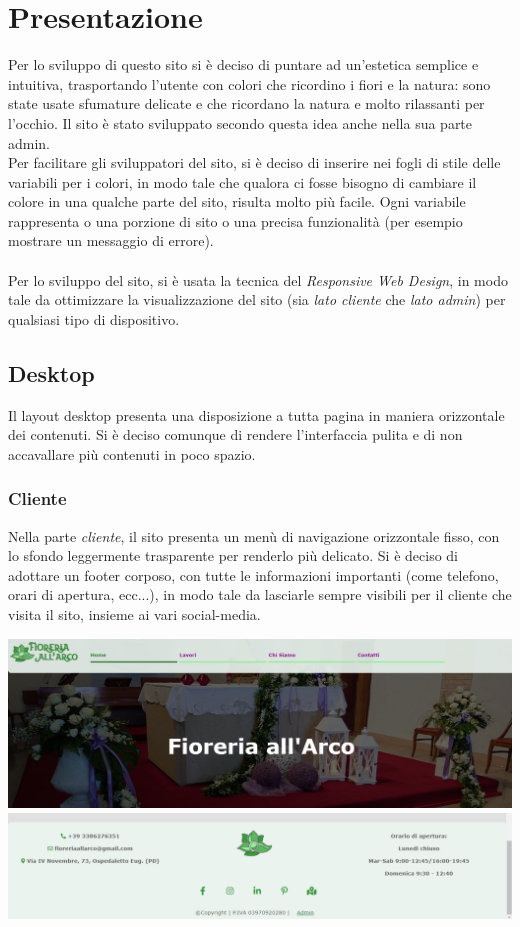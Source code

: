 \section{Presentazione}
Per lo sviluppo di questo sito si è deciso di puntare ad un'estetica semplice e intuitiva, trasportando l'utente con colori che ricordino i fiori e la natura: sono state usate sfumature delicate e che ricordano la natura e molto rilassanti per l'occhio. Il sito è stato sviluppato secondo questa idea anche nella sua parte admin.\\Per facilitare gli sviluppatori del sito, si è deciso di inserire nei fogli di stile delle variabili per i colori, in modo tale che qualora ci fosse bisogno di cambiare il colore in una qualche parte del sito, risulta molto più facile. Ogni variabile rappresenta o una porzione di sito o una precisa funzionalità (per esempio mostrare un messaggio di errore).\\\\Per lo sviluppo del sito, si è usata la tecnica del \textit{Responsive Web Design}, in modo tale da ottimizzare la visualizzazione del sito (sia \textit{lato cliente} che \textit{lato admin}) per qualsiasi tipo di dispositivo. 

\subsection{Desktop}
Il layout desktop presenta una disposizione a tutta pagina in maniera orizzontale dei contenuti. Si è deciso comunque di rendere l'interfaccia pulita e di non accavallare più contenuti in poco spazio. 
\subsubsection{Cliente}
Nella parte \textit{cliente}, il sito presenta un menù di navigazione orizzontale fisso, con lo sfondo leggermente trasparente per renderlo più delicato.
Si è deciso di adottare un footer corposo, con tutte le informazioni importanti (come telefono, orari di apertura, ecc...), in modo tale da lasciarle sempre visibili per il cliente che visita il sito, insieme ai vari social-media.
\begin{center}
\includegraphics[scale = 0.35]{../latex/images/desktopclient.png}\\[0.5cm]
\includegraphics[scale = 0.35]{../latex/images/desktopclient-footer.png}\\[0.5cm]
\end{center}
